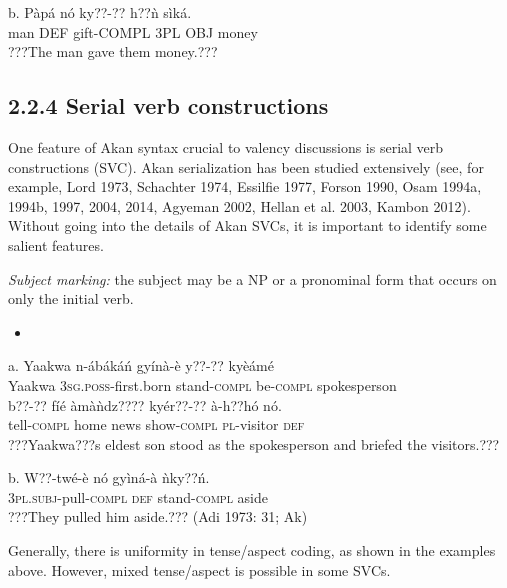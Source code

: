 \documentclass[output=paper]{langsci/langscibook}
\begin{document}
\gll  b.  P\`{a}p\'{a}  n\'{o}  ky??-??    h??\`{n}    s\`{i}k\'{a}.\\
       man  DEF  gift-COMPL  3PL OBJ  money\\
\glt   ???The man gave them money.???  
\z

\subsection{2.2.4  Serial verb constructions}

One feature of Akan syntax crucial to valency discussions is serial verb constructions (\textsc{SVC}). Akan serialization has been studied extensively (see, for example, Lord 1973, Schachter 1974, Essilfie 1977, Forson 1990, Osam 1994a, 1994b, 1997, 2004, 2014, Agyeman 2002, Hellan et al. 2003, Kambon 2012). Without going into the details of Akan SVCs, it is important to identify some salient features.

\begin{styleListei}
\emph{Subject marking:} the subject may be a NP or a pronominal form that occurs on only the initial verb. 
\end{styleListei}

\begin{itemize}
\item \end{itemize}
\gll a.  Yaakwa  n-\'{a}b\'{a}k\'{a}\'{n}     gy\'{i}n\`{a}-\`{e}   y??-??     ky\`{e}\'{a}m\'{e}\\
       Yaakwa  \textsc{3sg.poss}{}-first.born  stand-\textsc{compl}  be-\textsc{compl}   spokesperson\\
\gll   b??-??     f\'{i}\'{e}   \`{a}m\`{a}\`{n}dz????  ky\'{e}r??-??   \`{a}-h??h\'{o}    n\'{o}.\\
       tell-\textsc{compl}  home  news    show-\textsc{compl}  \textsc{pl}{}-visitor  \textsc{def}\\
\glt   ???Yaakwa???s eldest son stood as the spokesperson and briefed the visitors.??? \citep[83]{Krampah1970}
\z

\gll  b.  W??-tw\'{e}-\`{e}    n\'{o}  gy\`{i}n\'{a}-\`{a}  \`{n}ky??\'{n}.\\
       \textsc{3pl.subj}{}-pull\textsc{{}-compl}  \textsc{def}  stand-\textsc{compl}  aside\\
\glt   ???They pulled him aside.??? (Adi 1973: 31; Ak)
\z

Generally, there is uniformity in tense/aspect coding, as shown in the examples above. However, mixed tense/aspect is possible in some SVCs. 
\end{document}

